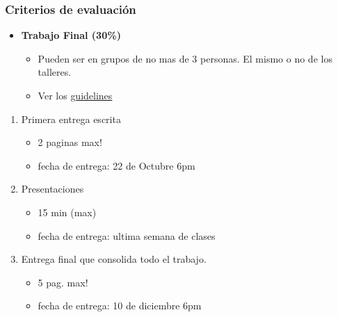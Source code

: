 \documentclass[
  shownotes,
  xcolor={svgnames},
  hyperref={colorlinks,citecolor=DarkBlue,linkcolor=DarkRed,urlcolor=DarkBlue}
  , aspectratio=169]{beamer}
\begin{document}
\begin{frame}
\frametitle{Criterios de evaluación}
\begin{itemize}

  \item {\bf Trabajo Final  (30\%)}
  \begin{itemize}
  \item Pueden ser en grupos de no mas de 3 personas. El mismo o no de los talleres.
  \item Ver los \href{https://github.com/ECON-4676-UNIANDES-Fall-2021/Problem_Sets/tree/master/Final_Project}{guidelines}
  \end{itemize}
  \end{itemize}
     \medskip
  \begin{enumerate}
      
      \item Primera entrega escrita 
      \begin{itemize}
        \item 2 paginas max!
        \item fecha de entrega: 22 de Octubre 6pm
      \end{itemize}
  
     \medskip
  \item  Presentaciones
      \begin{itemize}
        \item 15 min (max)
        \item fecha de entrega: ultima semana de clases
      \end{itemize}
      \medskip
    \item  Entrega final que consolida todo el trabajo.
      \begin{itemize}
        \item 5 pag. max!
        \item fecha de entrega:  10 de diciembre 6pm
      \end{itemize}
\end{enumerate}






\end{frame}
\end{document}

